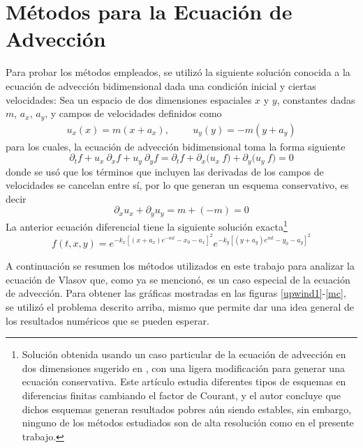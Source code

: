 \documentclass[11pt,twoside,openright,spanish]{report}
\numberwithin{equation}{chapter}
\numberwithin{figure}{chapter}
\numberwithin{table}{chapter}
\begin{document}
\section{Métodos para la Ecuación de Advección}\label{pruebascasoparticular}
\noindent
Para probar los métodos empleados, se utilizó la siguiente solución conocida a la ecuación de advección bidimensional dada una condición inicial y ciertas velocidades: Sea un espacio de dos dimensiones espaciales $x$ y $y$, constantes dadas $m$, $a_x$, $a_y$, y campos de velocidades definidos como
\begin{align*}
u_x(x)=m(x+a_x),\hspace{1cm} u_y(y)=-m(y+a_y)
\end{align*}
para los cuales, la ecuación de advección bidimensional toma la forma siguiente
\begin{equation}
\partial_t f+u_x\ \partial_x f+u_y\ \partial_y f=\partial_t f+\partial_x\bigg(u_x\ f\bigg)+\partial_y\bigg(u_y\ f\bigg)=0
\end{equation}
donde se usó que los términos que incluyen las derivadas de los campos de velocidades se cancelan entre sí, por lo que generan un esquema conservativo, es decir
\begin{equation}
\partial_x u_x+\partial_y u_y=m+(-m)=0
\end{equation}
La anterior ecuación diferencial tiene la siguiente solución exacta\footnote{Solución obtenida usando un caso particular de la ecuación de advección en dos dimensiones sugerido en \citet{schullenfdmfaivvf}, con una ligera modificación para generar una ecuación conservativa. Este artículo estudia diferentes tipos de esquemas en diferencias finitas cambiando el factor de Courant, y el autor concluye que dichos esquemas generan resultados pobres aún siendo estables, sin embargo, ninguno de los métodos estudiados son de alta resolución como en el presente trabajo.}
\begin{equation}
f(t,x,y)=e^{-k_x\left[(x+a_x)e^{-m t}-x_0-a_x\right]^2} e^{-k_y\left[(y+a_y)e^{m t}-y_0-a_y\right]^2}
\end{equation}

A continuación se resumen los métodos utilizados en este trabajo para analizar la ecuación de Vlasov que, como ya se mencionó, es un caso especial de la ecuación de advección. Para obtener las gráficas mostradas en las figuras \ref{upwind1}-\ref{mc}, se utilizó el problema descrito arriba, mismo que permite dar una idea general de los resultados numéricos que se pueden esperar. 
\end{document}
